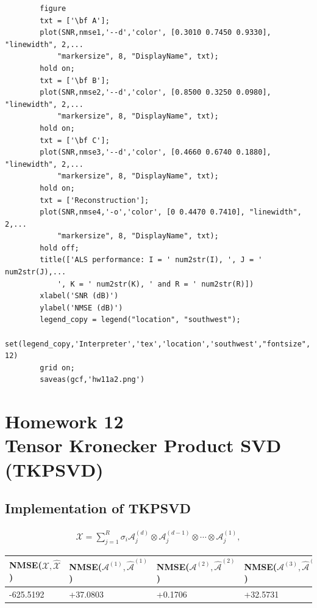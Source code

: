 \documentclass[a4paper,10pt]{article}
\begin{document}
\begin{verbatim}
        figure
        txt = ['\bf A'];
        plot(SNR,nmse1,'--d','color', [0.3010 0.7450 0.9330], "linewidth", 2,...
            "markersize", 8, "DisplayName", txt);
        hold on;
        txt = ['\bf B'];
        plot(SNR,nmse2,'--d','color', [0.8500 0.3250 0.0980], "linewidth", 2,...
            "markersize", 8, "DisplayName", txt);
        hold on;
        txt = ['\bf C'];
        plot(SNR,nmse3,'--d','color', [0.4660 0.6740 0.1880], "linewidth", 2,...
            "markersize", 8, "DisplayName", txt);
        hold on;
        txt = ['Reconstruction'];
        plot(SNR,nmse4,'-o','color', [0 0.4470 0.7410], "linewidth", 2,...
            "markersize", 8, "DisplayName", txt);
        hold off;
        title(['ALS performance: I = ' num2str(I), ', J = ' num2str(J),...
            ', K = ' num2str(K), ' and R = ' num2str(R)])
        xlabel('SNR (dB)')
        ylabel('NMSE (dB)')
        legend_copy = legend("location", "southwest");
        set(legend_copy,'Interpreter','tex','location','southwest',"fontsize", 12)
        grid on;
        saveas(gcf,'hw11a2.png')
    \end{verbatim}
    
\newpage
\section*{Homework 12 \\ Tensor Kronecker Product SVD (TKPSVD)}

    \subsection*{Implementation of TKPSVD}

    \begin{align}
        \mathcal{X} = \sum^{R}_{j = 1} \sigma_{i} \mathcal{A}^{(d)}_{j} \otimes \mathcal{A}^{(d - 1)}_{j}  \otimes \cdots \otimes \mathcal{A}^{(1)}_{j},  
    \end{align}

    \begin{table}[ht!]
        \centering
        \begin{tabular}{|l|l|l|l|}
        \hline
        NMSE($\mathcal{X}, \mathcal{\hat{X}}$) & NMSE($\mathcal{A}^{(1)}, \mathcal{\hat{A}}^{(1)}$) & NMSE($\mathcal{A}^{(2)}, \mathcal{\hat{A}}^{(2)}$) & NMSE($\mathcal{A}^{(3)}, \mathcal{\hat{A}}^{(3)}$) \\ \hline
        -625.5192 & +37.0803 & +0.1706 & +32.5731 \\ \hline
        \end{tabular}
    \end{table}
\end{document}
